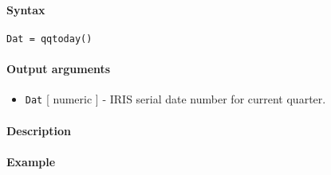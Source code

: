 


	\paragraph{Syntax}

\begin{verbatim}
Dat = qqtoday()
\end{verbatim}

\paragraph{Output arguments}

\begin{itemize}
\itemsep1pt\parskip0pt
\item
  \texttt{Dat} {[} numeric {]} - IRIS serial date number for current
  quarter.
\end{itemize}

\paragraph{Description}

\paragraph{Example}


